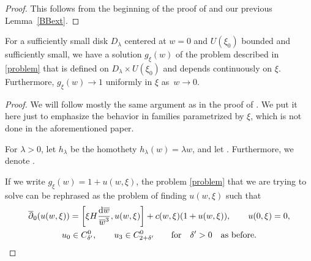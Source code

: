 \begin{proof}
This follows from the beginning of the proof of \cite[Lemma 7.1]{BB04} and our previous Lem\-ma~\ref{BBext}.
\end{proof}

\begin{Theorem} For a sufficiently small disk $D_{\lambda}$ centered at $w=0$ and $U(\xi_0)$ bounded and sufficiently small, we have a solution $g_{\xi}(w)$ of the problem described in \eqref{problem} that is defined on ${D_{\lambda}\times U(\xi_0)}$ and depends continuously on $\xi$. Furthermore, $g_{\xi}(w) \to 1$ uniformly in $\xi$ as~${w\to 0}$.
\end{Theorem}

\begin{proof} We will follow mostly the same argument as in the proof of \cite[Lemma 7.1]{BB04}. We put it here just to emphasize the behavior in families parametrized by $\xi$, which is not done in the aforementioned paper.

For $\lambda >0$, let $h_{\lambda}$ be the homothety $h_{\lambda}(w)=\lambda w$, and let . Furthermore, we denote .

If we write $g_{\xi}(w)=1+u(w,\xi)$, the problem \eqref{problem} that we are trying to solve can be rephrased as the problem of finding $u(w,\xi)$ such that
\begin{gather*}
 \overline{\partial}_0(u(w,\xi))=\left[\xi H \frac{{\rm d}\overline{w}}{\overline{w}^3},u(w,\xi)\right] +c(w,\xi)(1+u(w,\xi)),\qquad
 u(0,\xi)=0,\\
 u_0 \in C^0_{\delta'},\qquad u_3 \in C^0_{2+\delta'} \qquad \text{for} \quad \delta'>0 \quad \text{as before}.
\end{gather*}


\end{proof}
